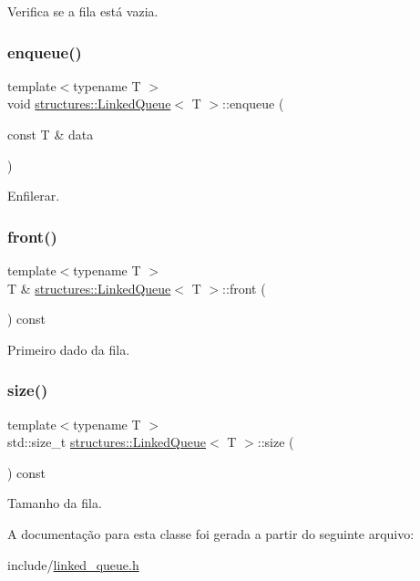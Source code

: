 Verifica se a fila está vazia. 

\mbox{\label{classstructures_1_1LinkedQueue_a6e9d6e444c5d534d01736bb82c34c815}} 
\subsubsection{\texorpdfstring{enqueue()}{enqueue()}}
{\footnotesize\ttfamily template$<$typename T $>$ \\
void \hyperlink{classstructures_1_1LinkedQueue}{structures\+::\+Linked\+Queue}$<$ T $>$\+::enqueue (\begin{DoxyParamCaption}\item[{const T \&}]{data }\end{DoxyParamCaption})}



Enfilerar. 

\mbox{\label{classstructures_1_1LinkedQueue_a904219098f1f6b3aa229a8ea0f929b64}} 
\subsubsection{\texorpdfstring{front()}{front()}}
{\footnotesize\ttfamily template$<$typename T $>$ \\
T \& \hyperlink{classstructures_1_1LinkedQueue}{structures\+::\+Linked\+Queue}$<$ T $>$\+::front (\begin{DoxyParamCaption}{ }\end{DoxyParamCaption}) const}



Primeiro dado da fila. 

\mbox{\label{classstructures_1_1LinkedQueue_ab86b0d95b796c277a21b89f106efd173}} 
\subsubsection{\texorpdfstring{size()}{size()}}
{\footnotesize\ttfamily template$<$typename T $>$ \\
std\+::size\+\_\+t \hyperlink{classstructures_1_1LinkedQueue}{structures\+::\+Linked\+Queue}$<$ T $>$\+::size (\begin{DoxyParamCaption}{ }\end{DoxyParamCaption}) const}



Tamanho da fila. 



A documentação para esta classe foi gerada a partir do seguinte arquivo\+:\begin{DoxyCompactItemize}
\item 
include/\hyperlink{linked__queue_8h}{linked\+\_\+queue.\+h}\end{DoxyCompactItemize}
